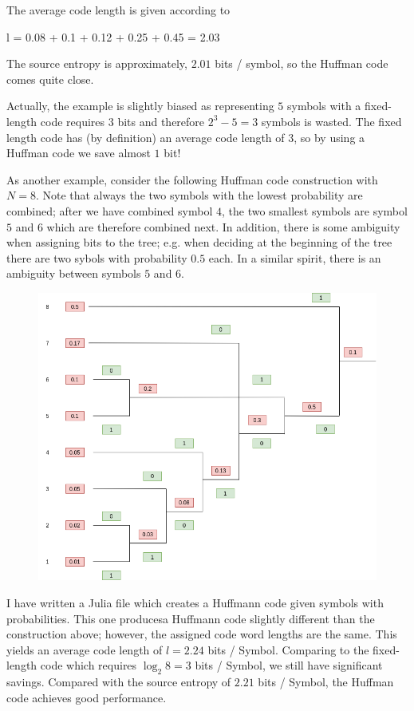 \vspace{3mm}

The average code length is given according to

\bee
l = 0.08  + 0.1  + 0.12  + 0.25  + 0.45  = 2.03 
\eee

The source entropy is approximately, $2.01$ bits / symbol, so the Huffman code comes quite close.

Actually, the example is slightly biased as representing $5$ symbols with a fixed-length code requires $3$ bits and therefore $2^3 - 5 = 3$ symbols is wasted. The fixed length code has (by definition) an average code length of $3$, so by using a Huffman code we save almost $1$ bit!

As another example, consider the following Huffman code construction with $N = 8$. Note that always the two symbols with the lowest probability are combined; after we have combined symbol $4$, the two smallest symbols are symbol $5$ and $6$ which are therefore combined next. In addition, there is some ambiguity when assigning bits to the tree; e.g. when deciding at the beginning of the tree there are two sybols with probability $0.5$ each. In a similar spirit, there is an ambiguity between symbols $5$ and $6$.

\begin{figure}[H]
    \centering
    \includegraphics[scale=0.5]{images/2021-04-14-code_2.png}
\end{figure}

I have written a Julia file which creates a Huffmann code given symbols with probabilities. This one producesa Huffmann code slightly different than the construction above; however, the assigned code word lengths are the same. This yields an average code length of $l = 2.24$ bits / Symbol. Comparing to the fixed-length code which requires $\log_2 8 = 3$ bits / Symbol, we still have significant savings. Compared with the source entropy of $2.21$ bits / Symbol, the Huffman code achieves good performance.



